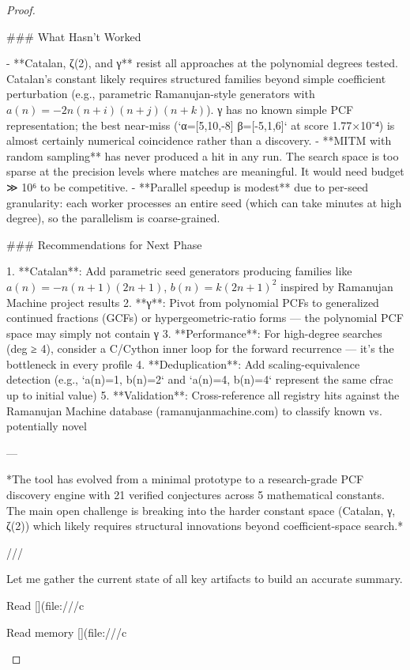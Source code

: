 \begin{theorem}
\begin{lemma}
\begin{proposition}
\begin{corollary}
\begin{proof}
\begin{remark}
### What Hasn't Worked

- **Catalan, ζ(2), and γ** resist all approaches at the polynomial degrees tested. Catalan's constant likely requires structured families beyond simple coefficient perturbation (e.g., parametric Ramanujan-style generators with $a(n) = -2n(n+i)(n+j)(n+k)$). γ has no known simple PCF representation; the best near-miss (`α=[5,10,-8] β=[-5,1,6]` at score 1.77×10⁻⁴) is almost certainly numerical coincidence rather than a discovery.
- **MITM with random sampling** has never produced a hit in any run. The search space is too sparse at the precision levels where matches are meaningful. It would need budget ≫ 10⁶ to be competitive.
- **Parallel speedup is modest** due to per-seed granularity: each worker processes an entire seed (which can take minutes at high degree), so the parallelism is coarse-grained.

### Recommendations for Next Phase

1. **Catalan**: Add parametric seed generators producing families like $a(n) = -n(n+1)(2n+1)$, $b(n) = k(2n+1)^2$ inspired by Ramanujan Machine project results
2. **γ**: Pivot from polynomial PCFs to generalized continued fractions (GCFs) or hypergeometric-ratio forms — the polynomial PCF space may simply not contain γ
3. **Performance**: For high-degree searches (deg ≥ 4), consider a C/Cython inner loop for the forward recurrence — it's the bottleneck in every profile
4. **Deduplication**: Add scaling-equivalence detection (e.g., `a(n)=1, b(n)=2` and `a(n)=4, b(n)=4` represent the same cfrac up to initial value)
5. **Validation**: Cross-reference all registry hits against the Ramanujan Machine database (ramanujanmachine.com) to classify known vs. potentially novel

---

*The tool has evolved from a minimal prototype to a research-grade PCF discovery engine with 21 verified conjectures across 5 mathematical constants. The main open challenge is breaking into the harder constant space (Catalan, γ, ζ(2)) which likely requires structural innovations beyond coefficient-space search.*  




///

Let me gather the current state of all key artifacts to build an accurate summary. 

Read [](file:///c%

Read memory [](file:///c%


\end{remark}
\end{proof}
\end{corollary}
\end{proposition}
\end{lemma}
\end{theorem}
